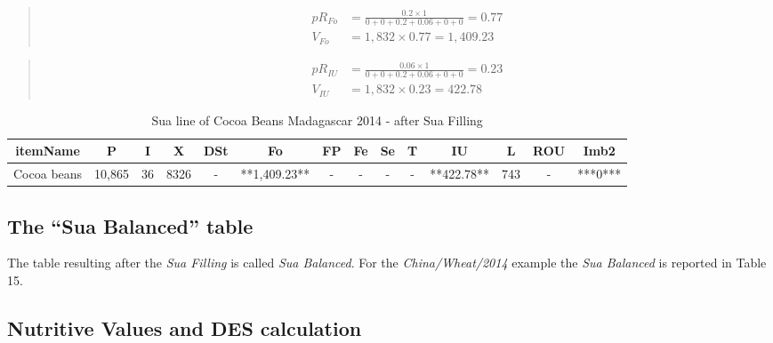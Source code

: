\documentclass[]{article}
\begin{document}
\begin{quote}
\begin{equation}
\begin{aligned}
pR_{Fo} &= \frac{0.2\times 1}{0 + 0 + 0.2 + 0.06 + 0 + 0} = 0.77 \\
V_{Fo} &= 1,832 \times 0.77 = 1,409.23 
\end{aligned}
\end{equation}
\end{quote}

\begin{quote}
\begin{equation}
\begin{aligned}
\label{eq:VIUC}
pR_{IU} &= \frac{0.06\times 1}{0 + 0 + 0.2 + 0.06 + 0 + 0} = 0.23\\
V_{IU} &= 1,832 \times 0.23 = 422.78
\end{aligned}
\end{equation}
\end{quote}

\begin{table}

\caption{\label{tab:t13}Sua line of Cocoa Beans Madagascar 2014 - after Sua Filling}
\centering
\begin{tabular}[t]{c|c|c|c|c|c|c|c|c|c|c|c|c|c}
\hline
itemName & P & I & X & DSt & Fo & FP & Fe & Se & T & IU & L & ROU & Imb2\\
\hline
Cocoa beans & 10,865 & 36 & 8326 & - & **1,409.23** & - & - & - & - & **422.78** & 743 & - & ***0***\\
\hline
\end{tabular}
\end{table}

\subsection*{\texorpdfstring{The ``Sua Balanced''
table}{The Sua Balanced table}}\label{the-sua-balanced-table}

The table resulting after the \emph{Sua Filling} is called \emph{Sua
Balanced}. For the \emph{China/Wheat/2014} example the \emph{Sua
Balanced} is reported in Table 15.

\subsection*{Nutritive Values and DES
calculation}\label{nutritive-values-and-des-calculation}
\end{document}

